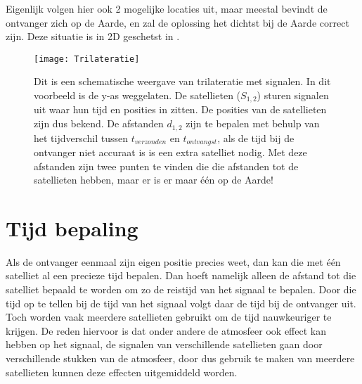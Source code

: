 Eigenlijk volgen hier ook 2 mogelijke locaties uit, maar meestal bevindt
de ontvanger zich op de Aarde, en zal de oplossing het dichtst bij de
Aarde correct zijn. Deze situatie is in 2D geschetst in
.

\begin{figure}
    \centering
    \texttt{[image: Trilateratie]}
    \caption{Dit is een schematische weergave van trilateratie met \gps
             signalen. In dit voorbeeld is de y-as weggelaten. De
             satellieten ($S_{1,2}$) sturen signalen uit waar hun tijd
             en posities in zitten. De posities van de satellieten zijn
             dus bekend. De afstanden $d_{1,2}$ zijn te bepalen met
             behulp van het tijdverschil tussen $t_{verzonden}$ en
             $t_{ontvangst}$, als de tijd bij de ontvanger niet accuraat
             is is een extra satelliet nodig. Met deze afstanden zijn
             twee punten te vinden die die afstanden tot de satellieten
             hebben, maar er is er maar één op de Aarde!}
    \label{fig:Trilateratie}
\end{figure}


\section{Tijd bepaling}

Als de ontvanger eenmaal zijn eigen positie precies weet, dan kan die
met één satelliet al een precieze tijd bepalen. Dan hoeft namelijk
alleen de afstand tot die satelliet bepaald te worden om zo de reistijd
van het signaal te bepalen. Door die tijd op te tellen bij de tijd van
het signaal volgt daar de tijd bij de ontvanger uit. Toch worden vaak
meerdere satellieten gebruikt om de tijd nauwkeuriger te krijgen. De
reden hiervoor is dat onder andere de atmosfeer ook effect kan hebben op
het signaal, de signalen van verschillende satellieten gaan door
verschillende stukken van de atmosfeer, door dus gebruik te maken van
meerdere satellieten kunnen deze effecten uitgemiddeld worden.

